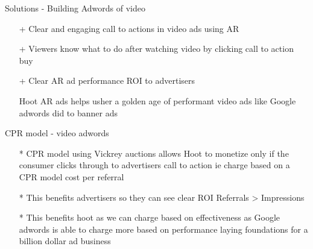 \documentclass[10pt]{beamer}
\begin{document}
\begin{frame}[fragile]{Solutions - Building Adwords of video}
\begin{itemize}
\item[+]Clear and engaging call to actions in video ads using AR
\item[+]Viewers know what to do after watching video by clicking call to action buy 
\item[+]Clear AR ad performance ROI to advertisers 

Hoot AR ads helps usher a golden age of performant video ads like Google adwords did to banner ads

\end{itemize}


\end{frame}
\begin{frame}[t]{CPR model - video adwords}
\begin{itemize}
\item[*]CPR model using Vickrey auctions allows Hoot to monetize only if the consumer clicks through to advertisers call to action ie charge based on a CPR model cost per referral
\item[*]This benefits advertisers so they can see clear ROI Referrals > Impressions
\item[*]This benefits hoot as we can charge based on effectiveness as Google adwords is able to charge more based on performance laying foundations for a billion dollar ad business
\end{itemize}
\end{frame}
\end{document}
